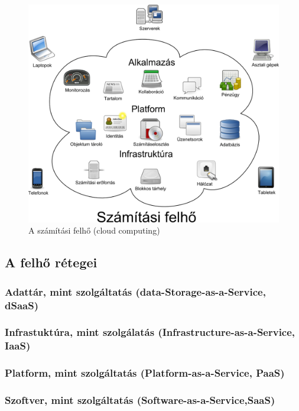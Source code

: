 \begin{figure}[h!]
\centering
\includegraphics[width=1.0\textwidth]{figures/Cloud_computing_hu.png}
\caption{A számítási felhő (\foreignlanguage{english}{cloud computing})} \label{fig:cloud_computing_hu}
\end{figure}



\subsection{A felhő rétegei}
\subsubsection{Adattár, mint szolgáltatás (\foreignlanguage{english}{data-Storage-as-a-Service, dSaaS})}
\subsubsection{Infrastuktúra, mint szolgálatás (\foreignlanguage{english}{Infrastructure-as-a-Service, IaaS})}
\subsubsection{Platform, mint szolgáltatás (\foreignlanguage{english}{Platform-as-a-Service, PaaS})}
\subsubsection{Szoftver, mint szolgáltatás (\foreignlanguage{english}{Software-as-a-Service,SaaS})}
